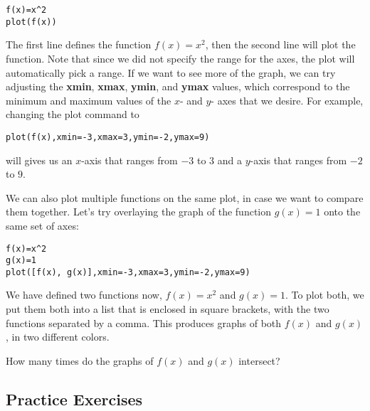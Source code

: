 \begin{verbatim}
f(x)=x^2
plot(f(x))
\end{verbatim}

The first line defines the function $f(x)=x^2$, then the second line will plot
the function. Note that since we did not specify the range for the axes, the
plot will automatically pick a range. If we want to see more of the graph, we
can try adjusting the \textbf{xmin}, \textbf{xmax}, \textbf{ymin}, and \textbf{ymax}
values, which correspond to the minimum and maximum values of the
$x$- and $y$- axes that we desire. For example, changing the plot
command to

\begin{verbatim}
plot(f(x),xmin=-3,xmax=3,ymin=-2,ymax=9)
\end{verbatim}

will gives us an $x$-axis that ranges from $-3$ to $3$ and a $y$-axis that
ranges from $-2$ to $9$.

We can also plot multiple functions on the same plot, in case we
want to compare them together. Let's try overlaying the graph of
the function $g(x)=1$ onto the same set of axes:

\begin{verbatim}
f(x)=x^2
g(x)=1
plot([f(x), g(x)],xmin=-3,xmax=3,ymin=-2,ymax=9)
\end{verbatim}

We have defined two functions now, $f(x)=x^2$ and $g(x)=1$. To
plot both, we put them both into a list that is enclosed in square
brackets, with the two functions separated by a comma. This produces
graphs of both $f(x)$ and $g(x)$, in two different colors.

How many times do the graphs of $f(x)$ and $g(x)$ intersect?

\subsection{Practice Exercises}


